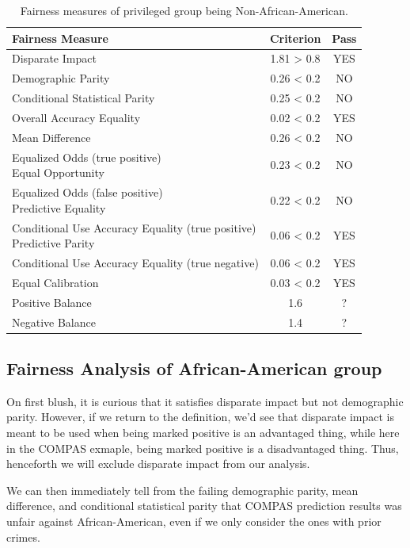 \documentclass[conference]{IEEEtran}
\begin{document}
\begin{table}[h]
    \centering
    \begin{tabular}{|l|c|c|} %
        \hline
        \textbf{Fairness Measure} & \textbf{Criterion} & \textbf{Pass} \\
        \hline
Disparate Impact & 1.81 > 0.8 & YES \\
\hline
Demographic Parity & 0.26 < 0.2 & NO \\
\hline
Conditional Statistical Parity & 0.25 < 0.2 & NO \\
\hline
Overall Accuracy Equality & 0.02 < 0.2 & YES \\
\hline
Mean Difference & 0.26 < 0.2 & NO \\
\hline
\makecell[l]{Equalized Odds (true positive) \\ Equal Opportunity} & 0.23 < 0.2 & NO \\
\hline
\makecell[l]{Equalized Odds (false positive) \\ Predictive Equality} & 0.22 < 0.2 & NO \\
\hline
\makecell[l]{Conditional Use Accuracy Equality (true positive) \\ Predictive Parity} & 0.06 < 0.2 & YES \\
\hline
Conditional Use Accuracy Equality (true negative) & 0.06 < 0.2 & YES \\
\hline
Equal Calibration & 0.03 < 0.2 & YES \\
\hline
Positive Balance & 1.6 & ? \\
\hline
Negative Balance & 1.4 & ? \\
\hline
    \end{tabular}
    \caption{Fairness measures of privileged group being Non-African-American.}
    \label{tab:results}
\end{table}

\subsection{Fairness Analysis of African-American group}
On first blush, it is curious that it satisfies disparate impact but not demographic parity. However, if we return to the definition, we'd see that disparate impact is meant to be used when being marked positive is an advantaged thing, while here in the COMPAS exmaple, being marked positive is a disadvantaged thing. Thus, henceforth we will exclude disparate impact from our analysis.

We can then immediately tell from the failing demographic parity, mean difference, and conditional statistical parity that COMPAS prediction results was unfair against African-American, even if we only consider the ones with prior crimes.
\end{document}
